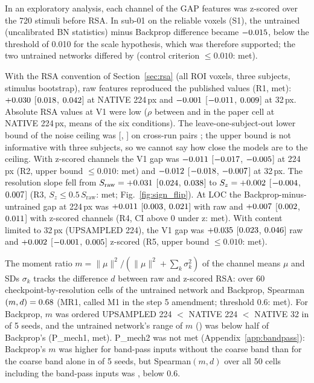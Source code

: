 In an exploratory analysis, each channel of the GAP features was z-scored over the 720
stimuli before RSA. In sub-01 on the reliable voxels (S1), the untrained (uncalibrated
BN statistics) minus Backprop difference became $-0.015$, below the threshold of
0.010 for the scale hypothesis, which was therefore supported; the two untrained
networks differed by \SOneStdRandBncal{} (control criterion $\leq 0.010$: met).

With the RSA convention of Section~\ref{sec:rsa} (all ROI voxels, three subjects,
stimulus bootstrap), raw features reproduced the published values (R1, met):
$+0.030$ [$0.018$, $0.042$] at NATIVE
224\,px and $-0.001$ [$-0.011$, $0.009$] at 32\,px.
Absolute RSA values at V1 were low ($\rho$ between \AbsRsaPaperMin{} and \AbsRsaPaperMax{}
in the paper cell at NATIVE 224\,px, means of the six conditions). The leave-one-subject-out
lower bound of the noise ceiling was \LosoBoundVone{} [\LosoBoundVoneLo, \LosoBoundVoneHi] on
cross-run pairs \citep{lrrsa}; the upper bound is not informative with three
subjects, so we cannot say how close the models are to the ceiling. With z-scored channels the V1 gap was $-0.011$
[$-0.017$, $-0.005$] at 224\,px (R2, upper bound
$\leq 0.010$: met) and $-0.012$ [$-0.018$, $-0.007$]
at 32\,px. The resolution slope fell from $S_{\mathrm{raw}} = +0.031$
[$0.024$, $0.038$] to $S_z = +0.002$ [$-0.004$, $0.007$]
(R3, $S_z \leq 0.5\,S_{\mathrm{raw}}$: met; Fig.~\ref{fig:sign_flip}). At LOC the
Backprop-minus-untrained gap at 224\,px was $+0.011$ [$0.003$, $0.021$]
with raw and $+0.007$ [$0.002$, $0.011$] with z-scored channels (R4, CI above
0 under z: met). With content limited to 32\,px (UPSAMPLED 224), the V1 gap was
$+0.035$ [$0.023$, $0.046$] raw and $+0.002$
[$-0.001$, $0.005$] z-scored (R5, upper bound $\leq 0.010$: met).

The moment ratio $m = \lVert\mu\rVert^2 / (\lVert\mu\rVert^2 + \sum_k \sigma_k^2)$ of the
channel means $\mu$ and SDs $\sigma_k$ tracks the difference $d$ between raw and
z-scored RSA: over 60 checkpoint-by-resolution cells of the untrained network and
Backprop, Spearman$(m, d) = 0.68$ (MR1, called M1 in the step 5 amendment; threshold 0.6: met). For Backprop, $m$ was
ordered UPSAMPLED 224 $<$ NATIVE 224 $<$ NATIVE 32 in \PMechOneBpSeeds{} of 5 seeds, and
the untrained network's range of $m$ (\PMechOneRandRange) was below half of Backprop's
(P\_mech1, met). P\_mech2 was not met (Appendix~\ref{app:bandpass}): Backprop's $m$ was higher for band-pass inputs
without the coarse band than for the coarse band alone in \PMechTwoNotchSeeds{} of 5
seeds, but Spearman$(m, d)$ over all 50 cells including the band-pass inputs was
\PMechTwoSpearman, below 0.6.

